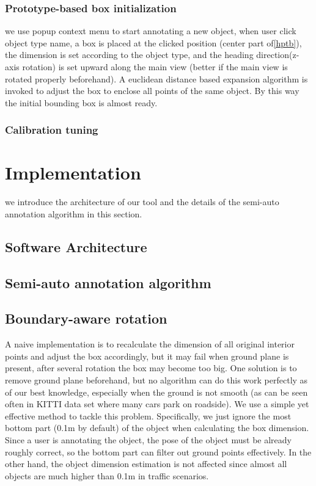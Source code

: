 \documentclass[letterpaper, 10 pt, conference]{ieeeconf}  %
\begin{document}
\subsubsection{Prototype-based box initialization}

we use popup context menu to start annotating a new object, when user click object type name, a box is placed at the clicked position (center part of\ref{hptb}), the dimension is set according to the object type, and the heading direction(z-axis rotation) is set upward along the main view (better if the main view is rotated properly beforehand).
A euclidean distance based expansion algorithm is invoked to adjust the box to enclose all points of the same object. By this way the initial bounding box is almost ready.

\subsubsection{Calibration tuning}

\section{Implementation}
\label{Implementation}

we introduce the architecture of our tool and the details of the semi-auto annotation algorithm in this section.

\subsection{Software Architecture}

\subsection{Semi-auto annotation algorithm}

\subsection{Boundary-aware rotation}

A naive implementation is to recalculate the dimension of all original interior points and adjust the box accordingly, but it may fail when ground plane is present, after several rotation the box may become too big. One solution is to remove ground plane beforehand, but no algorithm can do this work perfectly as of our best knowledge, especially when the ground is not smooth (as can be seen often in KITTI data set\cite{Geiger2012CVPR} where many cars park on roadside). We use a simple yet effective method to tackle this problem. Specifically, we just ignore the most bottom part (0.1m by default) of the object when calculating the box dimension. Since a user is annotating the object, the pose of the object must be already roughly correct, so the bottom part can filter out ground points effectively. In the other hand, the object dimension estimation is not affected since almost all objects are much higher than 0.1m in traffic scenarios.
\end{document}
